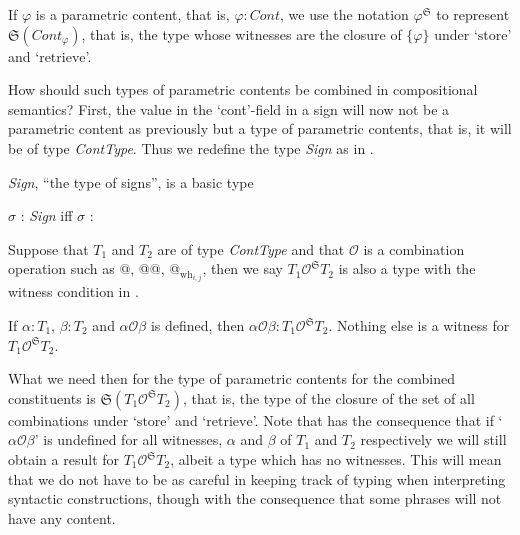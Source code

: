 If $\varphi$ is a parametric content, that is,
$\varphi:\textit{Cont}$, we use the notation $\varphi^{\mathfrak{S}}$
to represent $\mathfrak{S}(\textit{Cont}_{\varphi})$, that is, the type
whose witnesses are the closure of $\{\varphi\}$ under
`$\mathrm{store}$' and `$\mathrm{retrieve}$'.

How should such types of parametric contents be combined in
compositional semantics? First, the value in the `cont'-field in a
sign will now not be a parametric content as previously but a type of
parametric contents, that is, it will be of type \textit{ContType}.
Thus we redefine the type \textit{Sign} as in \nexteg{}.
\begin{ex} 
\begin{subex} 
 
\item \textit{Sign}, ``the type of signs'', is a basic type 
 
\item $\sigma$ : \textit{Sign} iff $\sigma$ :
 
\end{subex} 
   
\end{ex}
  
  
Suppose that $T_1$ and
$T_2$ are of type \textit{ContType} and that $\mathcal{O}$ is a combination
operation such as @, @@, @$_{\text{wh}_{i,j}}$, then we say $T_1\mathcal{O}^{\mathfrak{S}}T_2$
is also a type with the witness condition in \nexteg{}.
\begin{ex} 
If $\alpha:T_1$, $\beta:T_2$ and $\alpha\mathcal{O}\beta$ is defined,
then $\alpha\mathcal{O}\beta:T_1\mathcal{O}^{\mathfrak{S}}T_2$.
Nothing else is a witness for $T_1\mathcal{O}^{\mathfrak{S}}T_2$. 
\end{ex} 
What we need then for the type of parametric contents for the combined
constituents is
$\mathfrak{S}(T_1\mathcal{O}^{\mathfrak{S}}T_2)$, that
is, the type of the closure of the set of all combinations under
`$\mathrm{store}$' and `$\mathrm{retrieve}$'.  Note that \preveg{} has
the consequence that if `$\alpha\mathcal{O}\beta$' is undefined for all
witnesses, $\alpha$ and $\beta$ of $T_1$ and $T_2$ respectively we
will still obtain a result for $T_1\mathcal{O}^{\mathfrak{S}}T_2$, albeit a
type which has no witnesses.  This will mean that we do not have to be
as careful in keeping track of typing when interpreting syntactic
constructions, though with the consequence that some phrases will not
have any content.

